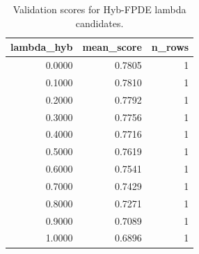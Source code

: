 \begin{table}[t]
\caption{Validation scores for Hyb-FPDE lambda candidates.}
\label{tab:lambda_distribution_computed}
\centering
\begin{tabular}{rrr}
\toprule
lambda\_hyb & mean\_score & n\_rows \\
\midrule
0.0000 & 0.7805 & 1 \\
0.1000 & 0.7810 & 1 \\
0.2000 & 0.7792 & 1 \\
0.3000 & 0.7756 & 1 \\
0.4000 & 0.7716 & 1 \\
0.5000 & 0.7619 & 1 \\
0.6000 & 0.7541 & 1 \\
0.7000 & 0.7429 & 1 \\
0.8000 & 0.7271 & 1 \\
0.9000 & 0.7089 & 1 \\
1.0000 & 0.6896 & 1 \\
\bottomrule
\end{tabular}

\end{table}
